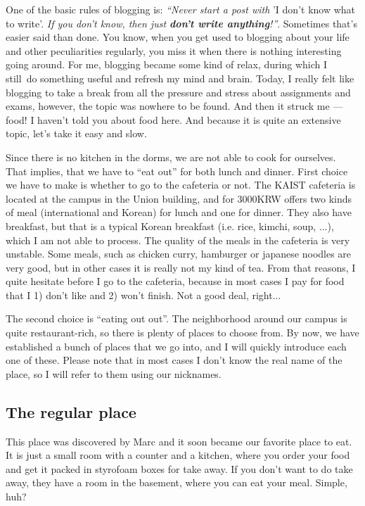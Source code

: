 \begin{post}
	\begin{content}
One of the basic rules of blogging is: \textit{``Never start a post with} 'I don't know what to write'. \textit{If you don't know, then just \textbf{don't write anything}!''}. Sometimes that's easier said than done. You know, when you get used to blogging about your life and other peculiarities regularly, you miss it when there is nothing interesting going around. For me, blogging became some kind of relax, during which I still do something useful and refresh my mind and brain. Today, I really felt like blogging to take a break from all the pressure and stress about assignments and exams, however, the topic was nowhere to be found. And then it struck me — food! I haven't told you about food here. And because it is quite an extensive topic, let's take it easy and slow.

Since there is no kitchen in the dorms, we are not able to cook for ourselves. That implies, that we have to ``eat out'' for both lunch and dinner. First choice we have to make is whether to go to the cafeteria or not. The KAIST cafeteria is located at the campus in the Union building, and for 3000KRW offers two kinds of meal (international and Korean) for lunch and one for dinner. They also have breakfast, but that is a typical Korean breakfast (i.e. rice, kimchi, soup, ...), which I am not able to process. The quality of the meals in the cafeteria is very unstable. Some meals, such as chicken curry, hamburger or japanese noodles are very good, but in other cases it is really not my kind of tea. From that reasons, I quite hesitate before I go to the cafeteria, because in most cases I pay for food that I 1) don't like and 2) won't finish. Not a good deal, right...

The second choice is ``eating out out''. The neighborhood around our campus is quite restaurant-rich, so there is plenty of places to choose from. By now, we have established a bunch of places that we go into, and I will quickly introduce each one of these. Please note that in most cases I don't know the real name of the place, so I will refer to them using our nicknames.

\subsection{The regular place}
This place was discovered by Marc and it soon became our favorite place to eat. It is just a small room with a counter and a kitchen, where you order your food and get it packed in styrofoam boxes for take away. If you don't want to do take away, they have a room in the basement, where you can eat your meal. Simple, huh?


\end{content}
\end{post}
